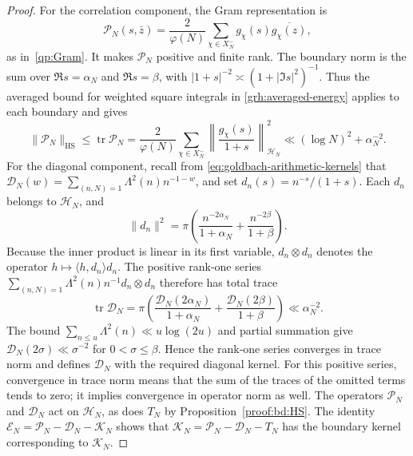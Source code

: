 \documentclass[12pt,a4paper]{amsart}
\numberwithin{equation}{section}
\def\le{\leqslant}
\theoremstyle{plain}
\theoremstyle{definition}
\theoremstyle{remark}
\begin{document}
\begin{proof}
For the correlation component, the Gram representation is
\[
 \mathscr P_N(s,\bar z)=\frac2{\varphi(N)}
       \sum_{\chi\in X_N^-}g_\chi(s)\overline{g_\chi(z)},
\]
as in~\eqref{qp:Gram}.
It makes $\mathcal P_N$ positive and finite rank.
The boundary norm is the sum over $\Re s=\alpha_N$ and
$\Re s=\beta$, with $|1+s|^{-2}\asymp(1+|\Im s|^2)^{-1}$.
Thus the averaged bound for weighted square integrals in
\eqref{grh:averaged-energy} applies to each boundary and gives
\[
 \|\mathcal P_N\|_{\mathrm{HS}}
 \le\operatorname{tr}\mathcal P_N
 =\frac2{\varphi(N)}\sum_{\chi\in X_N^-}
       \left\|\frac{g_\chi(s)}{1+s}\right\|_{\mathcal H_N}^2
 \ll (\log N)^2+\alpha_N^{-2}.
\]
For the diagonal component, recall from
\eqref{eq:goldbach-arithmetic-kernels} that
$\mathscr D_N(w)=\sum_{(n,N)=1}\Lambda^2(n)n^{-1-w}$,
and set $d_n(s)=n^{-s}/(1+s)$.
Each $d_n$ belongs to $\mathcal H_N$, and
\[
 \|d_n\|^2=\pi\left(\frac{n^{-2\alpha_N}}{1+\alpha_N}
                  +\frac{n^{-2\beta}}{1+\beta}\right).
\]
Because the inner product is linear in its first variable,
$d_n\otimes d_n$ denotes the operator
$h\mapsto\langle h,d_n\rangle d_n$.
The positive rank-one series
$\sum_{(n,N)=1}\Lambda^2(n)n^{-1}d_n\otimes d_n$
therefore has total trace
\[
 \operatorname{tr}\mathcal D_N
 =\pi\left(\frac{\mathscr D_N(2\alpha_N)}{1+\alpha_N}
                     +\frac{\mathscr D_N(2\beta)}{1+\beta}\right)
 \ll\alpha_N^{-2}.
\]
The bound $\sum_{n\le u}\Lambda^2(n)\ll u\log(2u)$ and partial
summation give $\mathscr D_N(2\sigma)\ll\sigma^{-2}$ for
$0<\sigma\le\beta$. Hence the rank-one series converges in trace
norm and defines $\mathcal D_N$ with the required diagonal kernel.
For this positive series, convergence in trace norm means that the
sum of the traces of the omitted terms tends to zero; it implies
convergence in operator norm as well. The operators
$\mathcal P_N$ and $\mathcal D_N$ act on
$\mathcal H_N$, as does $T_N$ by Proposition~\ref{proof:bd:HS}.
The identity $\mathscr E_N=\mathscr P_N-\mathscr D_N-\mathscr K_N$ shows that
$\mathcal K_N=\mathcal P_N-\mathcal D_N-T_N$ has the boundary
kernel corresponding to $\mathscr K_N$.


\end{proof}
\end{document}
